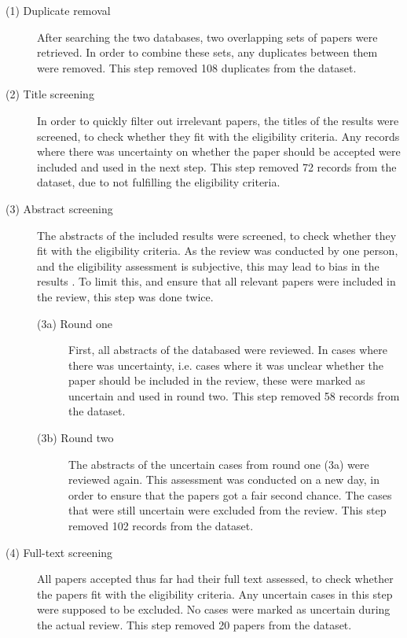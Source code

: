\begin{description}    
    \item[\textnormal{(1)} Duplicate removal] After searching the two databases, two overlapping sets of papers were retrieved. In order to combine these sets, any duplicates between them were removed. This step removed 108 duplicates from the dataset.
    
    \item[\textnormal{(2)} Title screening] In order to quickly filter out irrelevant papers, the titles of the results were screened, to check whether they fit with the eligibility criteria. Any records where there was uncertainty on whether the paper should be accepted were included and used in the next step. This step removed 72 records from the dataset, due to not fulfilling the eligibility criteria.
    
    \item[\textnormal{(3)} Abstract screening] The abstracts of the included results were screened, to check whether they fit with the eligibility criteria. As the review was conducted by one person, and the eligibility assessment is subjective, this may lead to bias in the results \parencite{Tranfield_2003}. To limit this, and ensure that all relevant papers were included in the review, this step was done twice.
    \begin{description}
        \item[\textnormal{(3a)} Round one] First, all abstracts of the databased were reviewed. In cases where there was uncertainty, i.e. cases where it was unclear whether the paper should be included in the review, these were marked as uncertain and used in round two. This step removed 58 records from the dataset.
        
        \item[\textnormal{(3b)} Round two] The abstracts of the uncertain cases from round one (3a) were reviewed again. This assessment was conducted on a new day, in order to ensure that the papers got a fair second chance. The cases that were still uncertain were excluded from the review. This step removed 102 records from the dataset.
    \end{description}
    
    \item[\textnormal{(4)} Full-text screening] All papers accepted thus far had their full text assessed, to check whether the papers fit with the eligibility criteria. Any uncertain cases in this step were supposed to be excluded. No cases were marked as uncertain during the actual review. This step removed 20 papers from the dataset.
    

\end{description}
